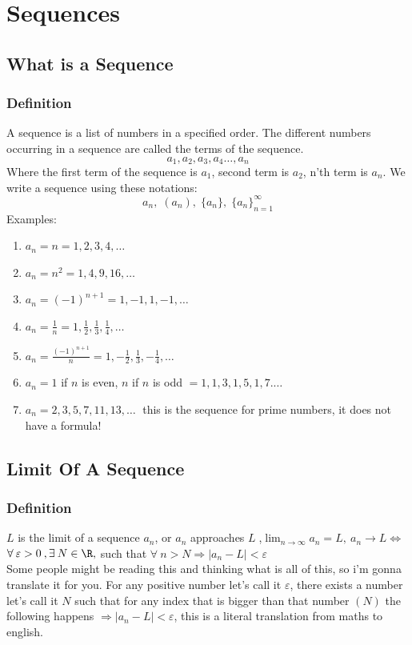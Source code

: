 \chapter{Sequences}
\section{What is a Sequence}
\subsection{Definition}
A sequence is a list of numbers in a specified order. The different numbers occurring in a sequence are called the terms of the sequence.\\
\[
    a_1,a_2,a_3,a_4\ldots,a_n
\]
Where the first term of the sequence is $a_1$, second term is $a_2$, n'th term is $a_n$.
We write a sequence using these notations:\\
\[
    a_n , \; (a_n), \; \{a_n\}, \; \{a_n\}_{n=1}^\infty
\]
Examples:\\
\begin{enumerate}
    \item $a_n = n = 1,2,3,4,\ldots$
    \item $a_n = n^2 = 1,4,9,16,\ldots$
    \item $a_n = (-1)^{n+1} = 1,-1,1,-1,\ldots$
    \item $a_n = \frac{1}{n} = 1,\frac{1}{2},\frac{1}{3},\frac{1}{4},\ldots$
    \item $a_n = \frac{(-1)^{n+1}}{n} = 1,-\frac{1}{2},\frac{1}{3},-\frac{1}{4},\ldots$
    \item $a_n = 1$ if $n$ is even, $n$ if $n$ is odd $= 1,1,3,1,5,1,7.\ldots$
    \item $a_n = 2,3,5,7,11,13,\ldots\;$ this is the sequence for prime numbers, it does not have a formula!
\end{enumerate}
\section{Limit Of A Sequence}
\subsection{Definition}
$L$ is the limit of a sequence $a_n$, or $a_n$ approaches $L\;$,$\lim_{n\to \infty} a_n = L,\: a_n\rightarrow L \iff$\\
$\forall\: \varepsilon>0 \:, \exists \: N\in \R,$ such that $\forall \: n>N \Longrightarrow |a_n - L|<\varepsilon$\\
Some people might be reading this and thinking what is all of this, so i'm gonna translate it for you.
For any positive number let's call it $\varepsilon$, there exists a number let's call it $N$ such that for any index that is bigger than that number $(N)$ the following happens $\Longrightarrow |a_n-L|<\varepsilon$, this is a literal translation from maths to english.\\\\

